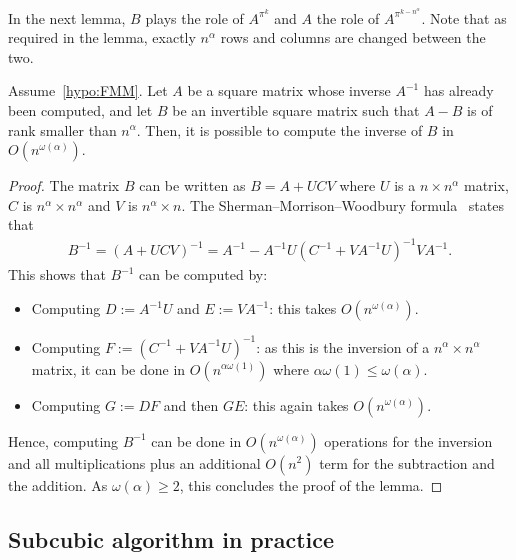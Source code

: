 \documentclass[acmsmall,screen,anonymous]{acmart}
\begin{document}

In the next lemma, $B$ plays the role of $A^{\pi^k}$ and $A$ the role of $A^{\pi^{k-n^{\alpha}}}$. Note that as required in the lemma, exactly $n^\alpha$ rows and columns are changed between the two.
\begin{lemma}
    \label{lem:woodbury}
    Assume~\ref{hypo:FMM}. Let $A$ be a square matrix whose inverse $A^{-1}$ has already been computed, and let $B$ be an invertible square matrix such that $A-B$ is of rank smaller than $n^{\alpha}$. Then, it is possible to compute the inverse of $B$ in $O(n^{\omega(\alpha)})$. 
\end{lemma}
\begin{proof}
    The matrix $B$ can be written as $B=A + UCV$ where $U$ is a $n\times n^\alpha$ matrix, $C$ is $n^\alpha\times n^\alpha$ and $V$ is $n^\alpha\times n$. The Sherman–Morrison–Woodbury formula~\cite{woodbury1950inverting} states that
    \begin{align*}
        B^{-1} = \left(A + UCV \right)^{-1} = A^{-1} - A^{-1}U \left(C^{-1} + VA^{-1}U \right)^{-1} VA^{-1}.
    \end{align*}
    This shows that $B^{-1}$ can be computed by:
    \begin{itemize}
        \item Computing $D:=A^{-1}U$ and $E:=VA^{-1}$: this takes $O(n^{\omega(\alpha)})$. 
        \item Computing $F:=\left(C^{-1} + VA^{-1}U \right)^{-1}$: as this is the inversion of a $n^\alpha\times n^\alpha$ matrix, it can be done in $O(n^{\alpha\omega(1)})$ where $\alpha\omega(1)\le \omega(\alpha)$.
        \item Computing $G:=DF$ and then $GE$: this again takes $O(n^{\omega(\alpha)})$. 
    \end{itemize}
    Hence, computing $B^{-1}$ can be done in $O(n^{\omega(\alpha)})$ operations for the inversion and all   multiplications plus an additional $O(n^2)$ term for the subtraction and the addition. As $\omega(\alpha)\ge2$, this concludes the proof of the lemma.
\end{proof}


\subsection{Subcubic algorithm in practice}
\end{document}
